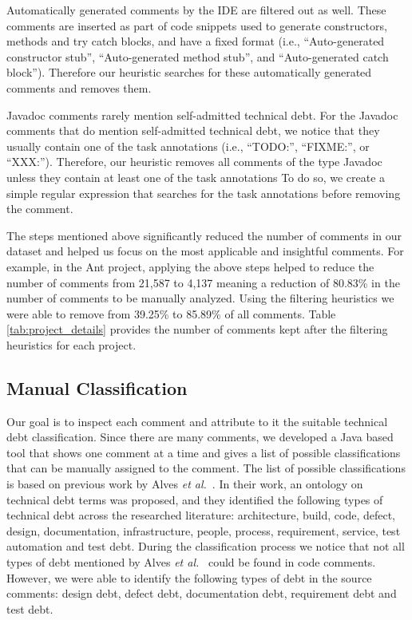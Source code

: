 Automatically generated comments by the IDE are filtered out as well. These comments are inserted as part of code snippets used to generate constructors, methods and try catch blocks, and have a fixed format (i.e., ``Auto-generated constructor stub'', ``Auto-generated method stub'', and ``Auto-generated catch block''). Therefore our heuristic searches for these automatically generated comments and removes them. 

Javadoc comments rarely mention self-admitted technical debt. For the Javadoc comments that do mention self-admitted technical debt, we notice that they usually contain one of the task annotations (i.e., ``TODO:'', ``FIXME:'', or ``XXX:''). Therefore, our heuristic removes all comments of the type Javadoc unless they contain at least one of the task annotations  To do so, we create a simple regular expression that searches for the task annotations before removing the comment.  

The steps mentioned above significantly reduced the number of comments in our dataset and helped us focus on the most applicable and insightful comments. For example, in the Ant project, applying the above steps helped to reduce the number of comments from 21,587 to 4,137 meaning a reduction of 80.83\% in the number of comments to be manually analyzed. Using the filtering heuristics we were able to remove from 39.25\% to 85.89\% of all comments. Table \ref{tab:project_details} provides the number of comments kept after the filtering heuristics for each project.

\subsection{Manual Classification}
\label{sub:manual_classification}

Our goal is to inspect each comment and attribute to it the suitable technical debt classification. Since there are many comments, we developed a Java based tool that shows one comment at a time and gives a list of possible classifications that can be manually assigned to the comment. The list of possible classifications is based on previous work by Alves \textit{et al.}~\cite{Alves2014MTD}. In their work, an ontology on technical debt terms was proposed, and they identified the following types of technical debt across the researched literature: architecture, build, code, defect, design, documentation, infrastructure, people, process, requirement, service, test automation and test debt. During the classification process we notice that not all types of debt mentioned by Alves \emph{et al.}~\cite{Alves2014MTD} could be found in code comments. However, we were able to identify the following types of debt in the source comments: design debt, defect debt, documentation debt, requirement debt and test debt. 

